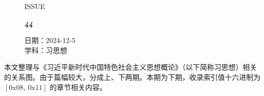 \documentclass[UTF8]{ctexart}
\newcommand\Black[1]{\textcolor[gray]{0.3}{#1}}
\newcommand\Brown[1]{\textcolor[HTML]{998A4E}{#1}}
\newcommand\IssueNumber{44}
\newcommand\Date{2024-12-5}
\newcommand\Subject{习思想}
\begin{document}
\begin{figure}[H]
\hspace{1cm}
\begin{minipage}[t]{0.3\textwidth}
\centering
    \Brown{\Genshin ISSUE}

    \vspace{-0.6cm}
    \Huge \Issue\slshape\bfseries\Black{\IssueNumber}
\end{minipage}
\hfill
\begin{minipage}[t]{0.3\textwidth}
\centering
    \Brown{日期：\Date} \\
\vspace{-0.1cm}
    \Brown{学科：\Subject} \\
\end{minipage}
\hspace{0.8cm}
\end{figure}

{\color{darkcyan}
本文整理与《习近平新时代中国特色社会主义思想概论》（以下简称习思想）相关的关系图。由于篇幅较大，分成上、下两期。本期为下期，收录索引值十六进制为 $\mathrm{[0x08,\  0x11]}$ 的章节相关内容。
}
\end{document}
